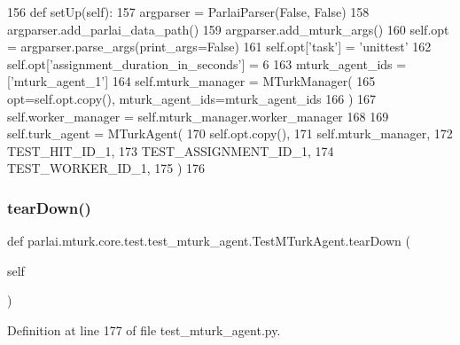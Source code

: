 \begin{DoxyCode}
156     \textcolor{keyword}{def }setUp(self):
157         argparser = ParlaiParser(\textcolor{keyword}{False}, \textcolor{keyword}{False})
158         argparser.add\_parlai\_data\_path()
159         argparser.add\_mturk\_args()
160         self.opt = argparser.parse\_args(print\_args=\textcolor{keyword}{False})
161         self.opt[\textcolor{stringliteral}{'task'}] = \textcolor{stringliteral}{'unittest'}
162         self.opt[\textcolor{stringliteral}{'assignment\_duration\_in\_seconds'}] = 6
163         mturk\_agent\_ids = [\textcolor{stringliteral}{'mturk\_agent\_1'}]
164         self.mturk\_manager = MTurkManager(
165             opt=self.opt.copy(), mturk\_agent\_ids=mturk\_agent\_ids
166         )
167         self.worker\_manager = self.mturk\_manager.worker\_manager
168 
169         self.turk\_agent = MTurkAgent(
170             self.opt.copy(),
171             self.mturk\_manager,
172             TEST\_HIT\_ID\_1,
173             TEST\_ASSIGNMENT\_ID\_1,
174             TEST\_WORKER\_ID\_1,
175         )
176 
\end{DoxyCode}
\mbox{\label{classparlai_1_1mturk_1_1core_1_1test_1_1test__mturk__agent_1_1TestMTurkAgent_aa6f732df3cff0314ab13445390108e36}} 
\subsubsection{\texorpdfstring{tear\+Down()}{tearDown()}}
{\footnotesize\ttfamily def parlai.\+mturk.\+core.\+test.\+test\+\_\+mturk\+\_\+agent.\+Test\+M\+Turk\+Agent.\+tear\+Down (\begin{DoxyParamCaption}\item[{}]{self }\end{DoxyParamCaption})}



Definition at line 177 of file test\+\_\+mturk\+\_\+agent.\+py.


